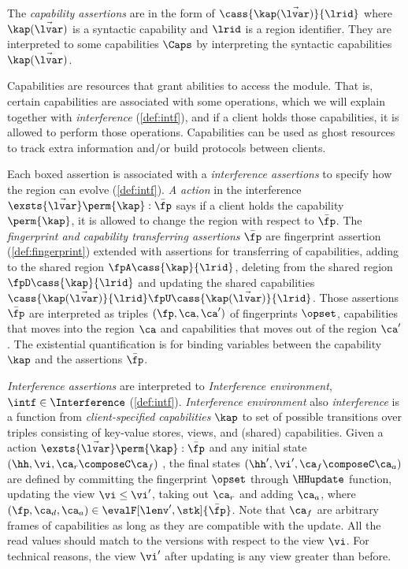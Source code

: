 The \emph{capability assertions} are in the form of \( \cass{\kap(\vec{\lvar})}{\lrid} \) where \( \kap(\vec{\lvar}) \) is a syntactic capability and \( \lrid \) is a region identifier.
They are interpreted to some capabilities \( \Caps \) by interpreting the syntactic capabilities \( \kap(\vec{\lvar}) \).

Capabilities are resources that grant abilities to access the module.
That is, certain capabilities are associated with some operations, which we will explain together with \emph{interference} (\cref{def:intf}),
and if a client holds those capabilities, it is allowed to perform those operations.
Capabilities can be used as ghost resources to track extra information and/or build protocols between clients.

Each boxed assertion is associated with a \emph{interference assertions} to specify how the region can evolve (\cref{def:intf}).
\emph{A action} in the interference \( \exsts{\vec{\lvar}} \perm{\kap} : \bar{\fp} \) says if a client holds the capability \( \perm{\kap} \), it is allowed to change the region with respect to \( \bar{\fp} \).
The \emph{fingerprint and capability transferring assertions} \( \bar{\fp} \) are fingerprint assertion (\cref{def:fingerprint}) extended with assertions for transferring of capabilities, \ie adding to the shared region \( \fpA \cass{\kap}{\lrid} \), deleting from the shared region \( \fpD \cass{\kap}{\lrid} \) and updating the shared capabilities \( \cass{\kap(\vec{\lvar})}{\lrid} \fpU \cass{\kap(\vec{\lvar})}{\lrid} \). 
Those assertions \( \bar{\fp} \) are interpreted as triples \( ( \fp, \ca, \ca' ) \) of fingerprints \( \opset \), capabilities that moves into the region \( \ca \) and capabilities that moves out of the region \( \ca' \).
The existential quantification is for binding variables between the capability \( \kap \) and the assertions \( \bar{\fp}\).

\emph{Interference assertions} are interpreted to \emph{Interference environment}, \( \intf \in \Interference \) (\cref{def:intf}).
\emph{Interference environment} also \emph{interference} is a function from \emph{client-specified capabilities} \( \kap \) to set of possible transitions over triples consisting of key-value stores, views, and (shared) capabilities. 
Given a action \( \exsts{\vec{\lvar}} \perm{\kap} : \bar{\fp} \) and any initial state \( (\hh, \vi, \ca_r \composeC \ca_f ) \) , the final states \( (\hh',\vi', \ca_f \composeC \ca_a) \) are defined by committing the fingerprint \( \opset \) through \( \HHupdate \) function, updating the view \( \vi \leq \vi' \), taking out \( \ca_r \) and adding \( \ca_a \), where \( (\fp, \ca_d, \ca_a) \in \evalF[\lenv',\stk]{\bar{\fp}} \).
Note that \( \ca_f \) are arbitrary frames of capabilities as long as they are compatible with the update.
All the read values should match to the versions with respect to the view \( \vi \).
For technical reasons, the view \( \vi' \) after updating is any view greater than before.

